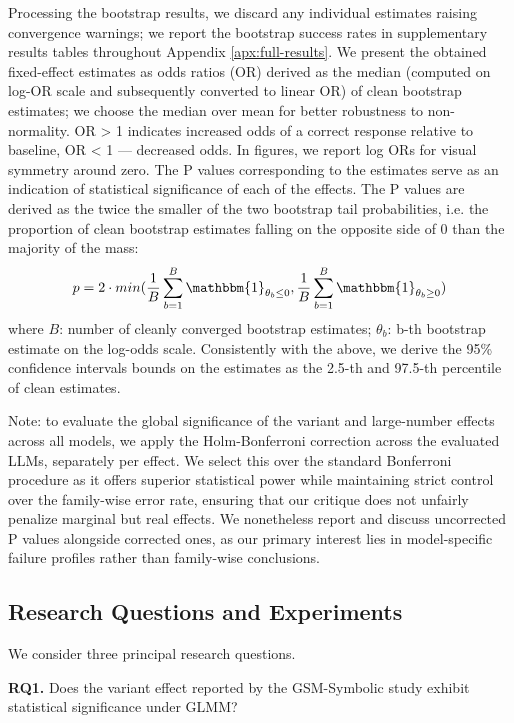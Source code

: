 \documentclass[11pt]{article}
\begin{document}
Processing the bootstrap results, we discard any individual estimates raising convergence warnings; we report the bootstrap success rates in supplementary results tables throughout Appendix \ref{apx:full-results}.
We present the obtained fixed-effect estimates as odds ratios (OR) derived as the median (computed on log-OR scale and subsequently converted to linear OR) of clean bootstrap estimates; we choose the median over mean for better robustness to non-normality. OR > 1 indicates increased odds of a correct response relative to baseline, OR < 1 --- decreased odds. In figures, we report log ORs for visual symmetry around zero. The P values corresponding to the estimates serve as an indication of statistical significance of each of the effects. The P values are derived as the twice the smaller of the two bootstrap tail probabilities, i.e. the proportion of clean bootstrap estimates falling on the opposite side of 0 than the majority of the mass:
%
\begin{equation}
    p=2\cdot min(\frac{1}{B}\sum_{b=1}^B\mathbbm{1}_{\theta_b\leq0}, \frac{1}{B}\sum_{b=1}^B\mathbbm{1}_{\theta_b\geq0})
\end{equation}
%
where $B$: number of cleanly converged bootstrap estimates; $\theta_b$: b-th bootstrap estimate on the log-odds scale. Consistently with the above, we derive the 95\% confidence intervals bounds on the estimates as the 2.5-th and 97.5-th percentile of clean estimates.

Note: to evaluate the global significance of the variant and large-number effects across all models, we apply the Holm-Bonferroni correction across the evaluated LLMs, separately per effect. We select this over the standard Bonferroni procedure as it offers superior statistical power while maintaining strict control over the family-wise error rate, ensuring that our critique does not unfairly penalize marginal but real effects. We nonetheless report and discuss uncorrected P values alongside corrected ones, as our primary interest lies in model-specific failure profiles rather than family-wise conclusions.

\subsection{Research Questions and Experiments}\label{sec:experiments}
We consider three principal research questions.

\textbf{RQ1.} Does the variant effect reported by the GSM-Symbolic study exhibit statistical significance under GLMM?
\end{document}
